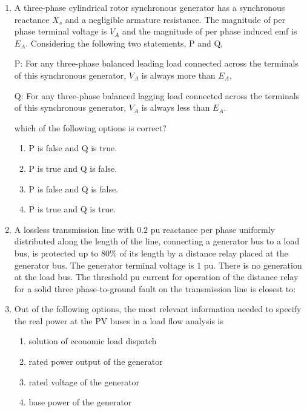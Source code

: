 \documentclass[journal,12pt,onecolumn]{IEEEtran}
\theoremstyle{remark}
\begin{document}
\begin{enumerate}[start=1, label=Q.\arabic*]
\item A three-phase cylindrical rotor synchronous generator has a synchronous reactance $X_{s}$ and a negligible armature resistance. The magnitude of per phase terminal voltage is $V_{A}$ and the magnitude of per phase induced emf is $E_{A}$. Considering the following two statements, P and Q,
\par P: For any three-phase balanced leading load connected across the terminals of this synchronous generator, $V_{A}$ is always more than $E_{A}$.
\par Q: For any three-phase balanced lagging load connected across the terminals of this synchronous generator, $V_{A}$ is always less than $E_{A}$.
\par which of the following options is correct?
    \begin{enumerate}
        \item P is false and Q is true.
        \item P is true and Q is false.
        \item P is false and Q is false.
        \item P is true and Q is true.
    \end{enumerate}

\hfill{}

\item A lossless transmission line with $0.2$ pu reactance per phase uniformly distributed along the length of the line, connecting a generator bus to a load bus, is protected up to $80\%$ of its length by a distance relay placed at the generator bus. The generator terminal voltage is $1$ pu. There is no generation at the load bus. The threshold pu current for operation of the distance relay for a solid three phase-to-ground fault on the transmission line is closest to:
    \begin{enumerate}
    \end{enumerate}

\hfill{}

\item Out of the following options, the most relevant information needed to specify the real power  at the PV buses in a load flow analysis is
    \begin{enumerate}
        \item solution of economic load dispatch
        \item rated power output of the generator
        \item rated voltage of the generator
        \item base power of the generator
    \end{enumerate}


\end{enumerate}
\end{document}
